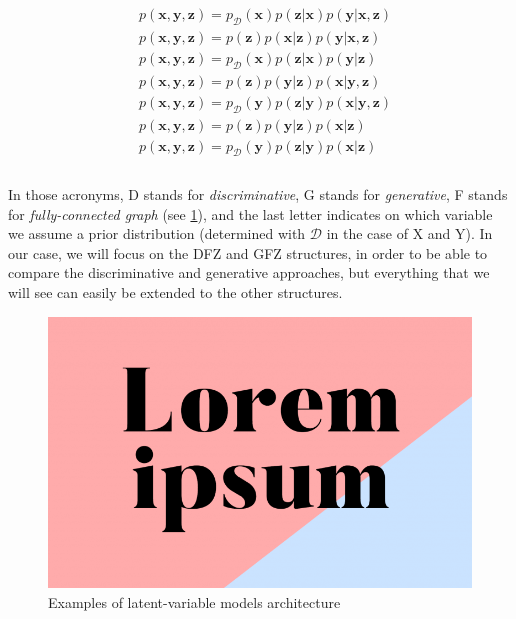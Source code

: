 \documentclass[11pt,twocolumn,letterpaper]{article}
\begin{document}
\begin{align*}
 & p(\bm{x}, \bm{y}, \bm{z}) = p_{\mathcal{D}}(\bm{x})p(\bm{z}|\bm{x})p(\bm{y}|\bm{x}, \bm{z}) \tag{DFX} \\
 & p(\bm{x}, \bm{y}, \bm{z}) = p(\bm{z})p(\bm{x}|\bm{z})p(\bm{y}|\bm{x}, \bm{z}) \tag{DFZ} \\
 & p(\bm{x}, \bm{y}, \bm{z}) = p_{\mathcal{D}}(\bm{x})p(\bm{z}|\bm{x})p(\bm{y}|\bm{z}) \tag{DBX} \\
 & p(\bm{x}, \bm{y}, \bm{z}) = p(\bm{z})p(\bm{y}|\bm{z})p(\bm{x}|\bm{y}, \bm{z}) \tag{GFZ} \\
 & p(\bm{x}, \bm{y}, \bm{z}) = p_{\mathcal{D}}(\bm{y})p(\bm{z}|\bm{y})p(\bm{x}|\bm{y}, \bm{z}) \tag{GFY} \\
 & p(\bm{x}, \bm{y}, \bm{z}) = p(\bm{z})p(\bm{y}|\bm{z})p(\bm{x}|\bm{z}) \tag{GBZ} \\
 & p(\bm{x}, \bm{y}, \bm{z}) = p_{\mathcal{D}}(\bm{y})p(\bm{z}|\bm{y})p(\bm{x}|\bm{z}) \tag{GBY} \\
\end{align*}

\paragraph{} In those acronyms, D stands for \textit{discriminative}, G stands for \textit{generative}, F stands for \textit{fully-connected graph} (see \ref{fig:graphical_models_architecture}), and the last letter indicates on which variable we assume a prior distribution (determined with $\mathcal{D}$ in the case of X and Y). In our case, we will focus on the DFZ and GFZ structures, in order to be able to compare the discriminative and generative approaches, but everything that we will see can easily be extended to the other structures.

\begin{figure}[h]
\begin{center}
\includegraphics[width=0.8\linewidth]{illustrations/graphical_models_architecture.png}
\end{center}
\caption{Examples of latent-variable models architecture}
\label{fig:graphical_models_architecture}
\end{figure}
\end{document}
